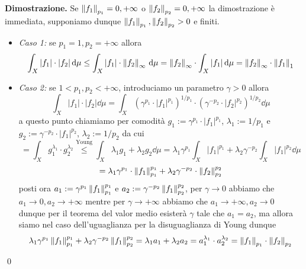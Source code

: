 
\textbf{Dimostrazione.}
Se $\left\lVert f_1 \right\rVert_{p_1} = 0,+\infty$ o $\left\lVert f_2 \right\rVert_{p_2} = 0,+\infty$ la dimostrazione è immediata, supponiamo dunque $\left\lVert f_1 \right\rVert_{p_1}, \left\lVert f_2 \right\rVert_{p_2} > 0$ e finiti.

\begin{itemize}
	\item \textit{Caso 1:} se $p_1 = 1, p_2 = +\infty$ allora
		$$
		\int_X |f_1| \cdot |f_2| \,\mathrm{d} \mu 
		\leq \int_X |f_1| \cdot \left\lVert f_2 \right\rVert_{\infty} \,\mathrm{d} \mu
		= \left\lVert f_2 \right\rVert_{\infty} \cdot \int_X |f_1| \,\mathrm{d} \mu
		= \left\lVert f_2 \right\rVert_{\infty} \cdot \left\lVert f_1 \right\rVert_{1} 
		$$

	\item \textit{Caso 2:} se $1 < p_1, p_2 < +\infty$, introduciamo un parametro $\gamma > 0$ allora
		$$
		\int_X |f_1| \cdot |f_2| \dd \mu 
		= \int_X \left( \gamma^{p_1} \cdot |f_1|^{p_1} \right)^{1/p_1} \cdot \left( \gamma^{-p_2} \cdot |f_2|^{p_2} \right)^{1/p_2} \dd \mu
		$$
		a questo punto chiamiamo per comodità $g_1 := \gamma^{p_1} \cdot |f_1|^{p_1}$, $\lambda_1 := 1 / p_1$ e $g_2 := \gamma^{-p_2} \cdot |f_1|^{p_2}$, $\lambda_2 := 1 / p_2$ da cui
		$$
		= \int_X g_1^{\lambda_1} \cdot g_2^{\lambda_2} 
		\overset{\text{Young}}{\leq} \int_X \lambda_1 g_1 + \lambda_2 g_2 \dd \mu
		= \lambda_1 \gamma^{p_1} \int_X |f_1|^{p_1} + \lambda_2 \gamma^{-p_2} \int_X |f_1|^{p_2} \dd \mu
		$$
		$$
		= \lambda_1 \gamma^{p_1} \cdot \left\lVert f_1 \right\rVert_{p_1}^{p_1} + \lambda_2 \gamma^{-p_2} \cdot \left\lVert f_2 \right\rVert_{p_2}^{p_2}
		$$
		posti ora $a_1 := \gamma^{p_1} \left\lVert f_1 \right\rVert_{p_1}^{p_1}$ e $a_2 := \gamma^{-p_2} \left\lVert f_1 \right\rVert_{p_2}^{p_2}$, per $\gamma \to 0$ abbiamo che $a_1 \to 0, a_2 \to +\infty$ mentre per $\gamma \to +\infty$ abbiamo che $a_1 \to +\infty, a_2 \to 0$ dunque per il teorema del valor medio esisterà $\gamma$ tale che $a_1 = a_2$, ma allora siamo nel caso dell'uguaglianza per la disuguaglianza di Young dunque
		$$
		\lambda_1 \gamma^{p_1} \left\lVert f_1 \right\rVert_{p_1}^{p_1} + \lambda_2 \gamma^{-p_2} \left\lVert f_1 \right\rVert_{p_2}^{p_2} 
		= \lambda_1 a_1 + \lambda_2 a_2 = a_1^{\lambda_1} \cdot a_2^{\lambda_2} 
		= \left\lVert f_1 \right\rVert_{p_1} \cdot \left\lVert f_2 \right\rVert_{p_2}
		$$
\end{itemize}
\qed

